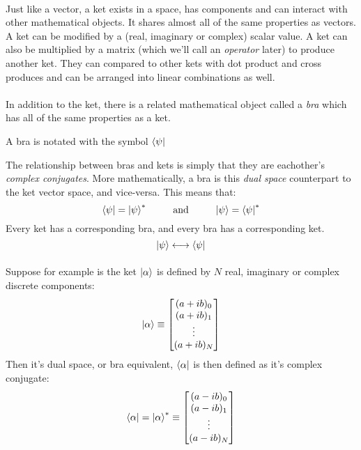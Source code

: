 \documentclass[12pt,letterpaper]{book}
\begin{document}
\paragraph*{}Just like a vector, a ket exists in a space, has components and can interact with other mathematical objects. It shares almost all of the same properties as vectors. A ket can be modified by a (real, imaginary or complex) scalar value. A ket can also be multiplied by a matrix (which we'll call an \textit{operator} later) to produce another ket. They can compared to other kets with dot product and cross produces and can be arranged into linear combinations as well.
\paragraph*{}In addition to the ket, there is a related mathematical object called a \textit{bra} which has all of the same properties as a ket.
\begin{center}
A bra is notated with the symbol $\bra{\psi}$
\end{center}
The relationship between bras and kets is simply that they are eachother's \textit{complex conjugates}. More mathematically, a bra is this \textit{dual space} counterpart to the ket vector space, and vice-versa. This means that:
\begin{equation}
\bra{\psi} = \ket{\psi}^* 
\text{\hspace*{8mm} and \hspace*{8mm}} 
\ket{\psi} = \bra{\psi}^*
\end{equation}
Every ket has a corresponding bra, and every bra has a corresponding ket.
\begin{equation}
\ket{\psi} \longleftrightarrow \bra{\psi}
\end{equation}

\paragraph*{}Suppose for example is the ket $\ket{\alpha}$ is defined by $N$ real, imaginary or complex discrete components:
\begin{equation}
\label{discrete ket}
\ket{\alpha} \equiv
\begin{bmatrix}
(a + ib)_0 \\ (a + ib)_1 \\ \vdots \\ (a + ib)_N
\end{bmatrix}
\end{equation}
Then it's dual space, or bra equivalent, $\bra{\alpha}$ is then defined as it's  complex conjugate:
\begin{equation}
\label{discrete bra}
\bra{\alpha} = 
\ket{\alpha}^* \equiv
\begin{bmatrix}
(a - ib)_0 \\ (a - ib)_1 \\ \vdots \\ (a - ib)_N
\end{bmatrix}
\end{equation}
\end{document}
